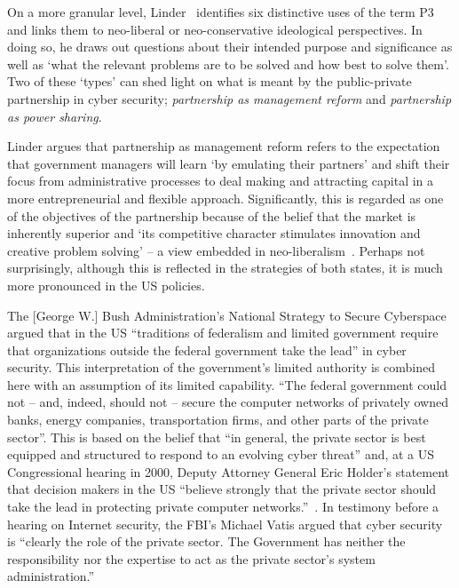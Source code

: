 \documentclass[a4paper,11pt]{article}
\begin{document}
On a more granular level, Linder~\cite{linder:1999} identifies six
distinctive uses of the term P3 and links them to neo-liberal or
neo-conservative ideological perspectives. In doing so, he draws out
questions about their intended purpose and significance as well as
`what the relevant problems are to be solved and how best to solve
them'. Two of these `types' can shed light on what is meant by the
public-private partnership in cyber security; {\emph{partnership as
management reform}} and {\emph{partnership as power sharing}}.

Linder argues that partnership as management reform refers to the
expectation that government managers will learn `by emulating their
partners' and shift their focus from administrative processes to
deal making and attracting capital in a more entrepreneurial and
flexible approach. Significantly, this is regarded as one of the
objectives of the partnership because of the belief that the market is
inherently superior and `its competitive character stimulates
innovation and creative problem solving' -- a view embedded in
neo-liberalism~\cite{linder:1999}. Perhaps not surprisingly, although
this is reflected in the strategies of both states, it is much more
pronounced in the US policies.

The [George W.] Bush Administration's National Strategy to Secure
Cyberspace~\cite{gwbush:2003} argued that in the US ``traditions of
federalism and limited government require that organizations outside
the federal government take the lead'' in cyber security.  This
interpretation of the government's limited authority is combined here
with an assumption of its limited capability. ``The federal government
could not -- and, indeed, should not -- secure the computer networks
of privately owned banks, energy companies, transportation firms, and
other parts of the private sector''. This is based on the belief that
``in general, the private sector is best equipped and structured to
respond to an evolving cyber threat'' and, at a US Congressional
hearing in 2000, Deputy Attorney General Eric Holder's statement that
decision makers in the US ``believe strongly that the private sector
should take the lead in protecting private computer
networks.''~\cite{holder:2000}. In testimony before a hearing on
Internet security, the FBI's Michael Vatis argued that cyber security
is ``clearly the role of the private sector. The Government has
neither the responsibility nor the expertise to act as the private
sector's system administration.''~\cite{vatis:2000}
\end{document}
